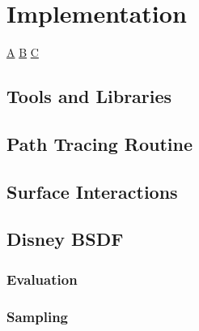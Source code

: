 \chapter{Implementation}

\href{https://microsoft.github.io/DirectX-Specs/d3d/Raytracing.html#intro}{A}
\href{https://developer.nvidia.com/rtx/ray-tracing/optix}{B}
\href{https://www.khronos.org/blog/vulkan-ray-tracing-final-specification-release}{C}

\cite{benthin_realtime_2006}

\section{Tools and Libraries}

\section{Path Tracing Routine}

\section{Surface Interactions}

\section{Disney BSDF}

\subsection{Evaluation}

\subsection{Sampling}